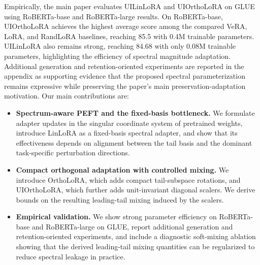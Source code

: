 Empirically, the main paper evaluates UILinLoRA and UIOrthoLoRA on GLUE using RoBERTa-base and RoBERTa-large results. On RoBERTa-base, UIOrthoLoRA achieves the highest average score among the compared VeRA, LoRA, and RandLoRA baselines, reaching 85.5 with 0.4M trainable parameters. UILinLoRA also remains strong, reaching 84.68 with only 0.08M trainable parameters, highlighting the efficiency of spectral magnitude adaptation. Additional generation and retention-oriented experiments are reported in the appendix as supporting evidence that the proposed spectral parameterization remains expressive while preserving the paper's main preservation-adaptation motivation.
Our main contributions are:
\begin{itemize}
    \item \textbf{Spectrum-aware PEFT and the fixed-basis bottleneck.}
    We formulate adapter updates in the singular coordinate system of pretrained weights, introduce LinLoRA as a fixed-basis spectral adapter, and show that its effectiveness depends on alignment between the tail basis and the dominant task-specific perturbation directions.

    \item \textbf{Compact orthogonal adaptation with controlled mixing.}
    We introduce OrthoLoRA, which adds compact tail-subspace rotations, and UIOrthoLoRA, which further adds unit-invariant diagonal scalers. We derive bounds on the resulting leading-tail mixing induced by the scalers.

    \item \textbf{Empirical validation.}
    We show strong parameter efficiency on RoBERTa-base and RoBERTa-large on GLUE,
    report additional generation and retention-oriented experiments, and include a diagnostic soft-mixing ablation showing that the derived leading-tail mixing quantities can be regularized to reduce spectral leakage in practice.
\end{itemize}
